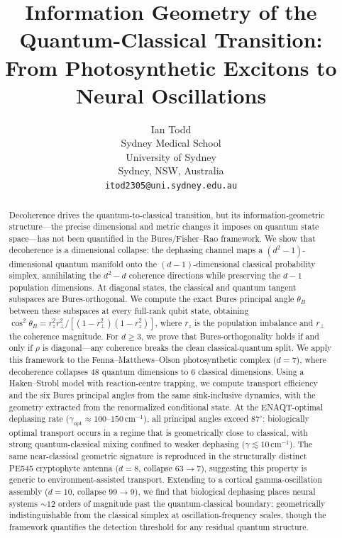 \documentclass[12pt,a4paper]{article}
\title{Information Geometry of the Quantum-Classical Transition:\\ From Photosynthetic Excitons to Neural Oscillations}
\author{Ian Todd\\
Sydney Medical School\\
University of Sydney\\
Sydney, NSW, Australia\\
\texttt{itod2305@uni.sydney.edu.au}}
\date{}
\theoremstyle{definition}
\theoremstyle{remark}
\begin{document}
\maketitle

\begin{abstract}
Decoherence drives the quantum-to-classical transition, but its information-geometric structure---the precise dimensional and metric changes it imposes on quantum state space---has not been quantified in the Bures/Fisher--Rao framework. We show that decoherence is a dimensional collapse: the dephasing channel maps a $(d^2{-}1)$-dimensional quantum manifold onto the $(d{-}1)$-dimensional classical probability simplex, annihilating the $d^2{-}d$ coherence directions while preserving the $d{-}1$ population dimensions. At diagonal states, the classical and quantum tangent subspaces are Bures-orthogonal. We compute the exact Bures principal angle $\theta_B$ between these subspaces at every full-rank qubit state, obtaining $\cos^2\theta_B = r_z^2 r_\perp^2/[(1{-}r_\perp^2)(1{-}r_z^2)]$, where $r_z$ is the population imbalance and $r_\perp$ the coherence magnitude. For $d \geq 3$, we prove that Bures-orthogonality holds if and only if $\rho$ is diagonal---any coherence breaks the clean classical-quantum split. We apply this framework to the Fenna--Matthews--Olson photosynthetic complex ($d = 7$), where decoherence collapses 48 quantum dimensions to 6 classical dimensions. Using a Haken--Strobl model with reaction-centre trapping, we compute transport efficiency and the six Bures principal angles from the same sink-inclusive dynamics, with the geometry extracted from the renormalized conditional state. At the ENAQT-optimal dephasing rate ($\gamma_{\mathrm{opt}} \approx 100$--$150$\,cm$^{-1}$), all principal angles exceed $87^\circ$: biologically optimal transport occurs in a regime that is geometrically close to classical, with strong quantum-classical mixing confined to weaker dephasing ($\gamma \lesssim 10$\,cm$^{-1}$). The same near-classical geometric signature is reproduced in the structurally distinct PE545 cryptophyte antenna ($d = 8$, collapse $63 \to 7$), suggesting this property is generic to environment-assisted transport. Extending to a cortical gamma-oscillation assembly ($d = 10$, collapse $99 \to 9$), we find that biological dephasing places neural systems ${\sim}12$ orders of magnitude past the quantum-classical boundary: geometrically indistinguishable from the classical simplex at oscillation-frequency scales, though the framework quantifies the detection threshold for any residual quantum structure.
\end{abstract}
\end{document}
